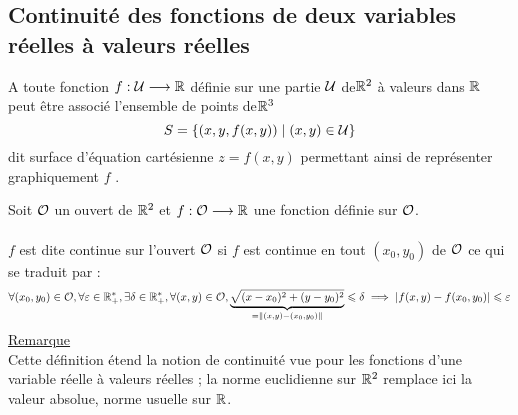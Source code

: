 \subsection{Continuité des fonctions de deux variables réelles à valeurs réelles}
\begin{defprop}
   
    A toute fonction \(f : \cal{U} \to  \R\) définie sur une partie \(\cal{U}\) de\( \R^2\) à valeurs dans \(\R\) peut être associé l’ensemble de points de\( \R^3\)
    \[S = \accol{(x, y, f (x, y)) \tq (x, y) \in \cal{U}}\]
    dit surface d’équation cartésienne \(z = f (x, y)\) permettant ainsi de représenter graphiquement \(f\) .
\end{defprop}
\begin{defprop}
    
    Soit \(\cal{O}\) un ouvert de \(\R^2\) et \(f : \cal{O} \to  \R\) une fonction définie sur \(\cal{O}\).\\~\\
    \(f\) est dite continue sur l’ouvert \(\cal{O}\) si \(f\) est continue en tout \((x_0, y_0)\) de \(\cal{O}\) ce qui se traduit par :
    \[\forall (x_0, y_0) \in \cal{O}, \forall \epsilon \in \Rps, \exists \delta \in \Rps, \forall (x, y) \in \cal{O}, \underbrace{\sqrt{(x - x_0)^2 + (y - y_0)^2}}_{= \norme{(x,y)-(x_0,y_0)}} \leq \delta \imp \abs{f (x, y) - f (x_0, y_0)} \leq \epsilon\]
    \underline{Remarque}\\
    Cette définition étend la notion de continuité vue pour les fonctions d’une variable réelle à valeurs réelles ; la norme euclidienne sur \(\R^2\) remplace ici la valeur absolue, norme usuelle sur \(\R\).
\end{defprop}
